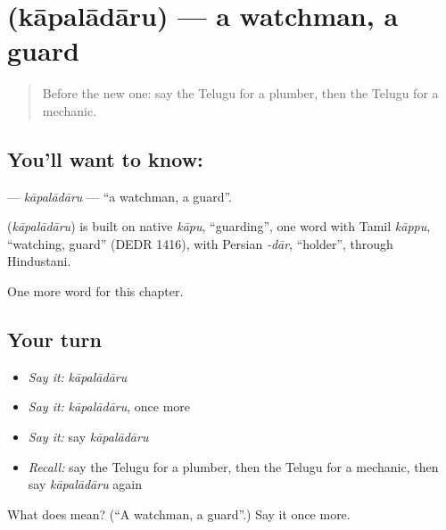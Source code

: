 \section[\texorpdfstring{\te{కాపలాదారు} (kāpalādāru)}{కాపలాదారు (kāpalādāru)}]{ (kāpalādāru) — a watchman, a guard}

\label{lesson:TE-C314-kapaladaru}



\begin{quote}
Before the new one: say the Telugu for a plumber, then the Telugu for a mechanic.
\end{quote}

\subsection*{You'll want to know: }
\textbf{} — \emph{kāpalādāru} — \textquotedblleft{}a watchman, a guard\textquotedblright{}.

\begin{cousinweb}
\textbf{} (\emph{kāpalādāru}) is built on native \emph{kāpu}, \textquotedblleft{}guarding\textquotedblright{}, one word with Tamil \emph{kāppu}, \textquotedblleft{}watching, guard\textquotedblright{} (DEDR 1416), with Persian \emph{-dār}, \textquotedblleft{}holder\textquotedblright{}, through Hindustani.
\end{cousinweb}

\begin{grammarlens}[title={What you've built}]
One more word for this chapter.
\end{grammarlens}

\subsection*{Your turn}
\begin{itemize}
\raggedright
  \item \emph{Say it:} \emph{kāpalādāru}
  \item \emph{Say it:} \emph{kāpalādāru}, once more
  \item \emph{Say it:} say \emph{kāpalādāru}
  \item \emph{Recall:} say the Telugu for a plumber, then the Telugu for a mechanic, then say \emph{kāpalādāru} again
\end{itemize}

\begin{tcolorbox}[breakable,colback=teal!4,colframe=teal!35!black,title={Before you move on}]
What does  mean? (\textquotedblleft{}A watchman, a guard\textquotedblright{}.) Say it once more.
\end{tcolorbox}

